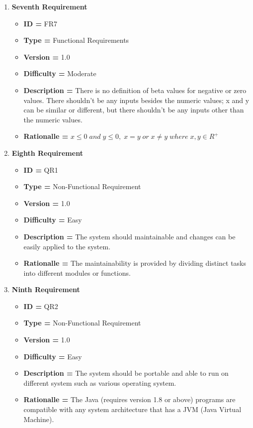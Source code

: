 \documentclass[12pt,a4paper]{report}
\begin{document}
\begin{enumerate}[noitemsep]
        \item \textbf{Seventh Requirement}
        \begin{itemize}
            \item \textbf{ID = } FR7
            \item\textbf{Type = } Functional Requirements
            \item\textbf{Version = } 1.0
            \item\textbf{Difficulty = } Moderate
            \item\textbf{Description = } There is no definition of beta values for negative or zero values. There shouldn't be any inputs besides the numeric values; x and y can be similar or different, but there shouldn't be any inputs other than the numeric values.
            \item\textbf{Rationalle = } $x \leq 0\;and\;y \leq 0,\;x = y \;or\; x \neq y \;where\; x,y \in  R^{+} $
        \end{itemize}
        \newpage
        
        \item \textbf{Eighth Requirement}
        \begin{itemize}
            \item \textbf{ID = } QR1
            \item \textbf{Type = } Non-Functional Requirement
            \item \textbf{Version = } 1.0
            \item \textbf{Difficulty = } Easy
            \item \textbf{Description = } The system should maintainable and changes can be easily applied to the system.
            \item \textbf{Rationalle = } The maintainability is provided by dividing distinct tasks into different modules or functions.
        \end{itemize}
        
        \item \textbf{Ninth Requirement}
        \begin{itemize}
            \item \textbf{ID = } QR2
            \item \textbf{Type = } Non-Functional Requirement
            \item \textbf{Version = } 1.0
            \item \textbf{Difficulty = } Easy
            \item \textbf{Description = } The system should be portable and able to run on different system such as various operating system.
            \item \textbf{Rationalle = } The Java (requires version 1.8 or above) programs are compatible with any system architecture that has a JVM (Java Virtual Machine).
        \end{itemize}
        

\end{enumerate}
\end{document}
